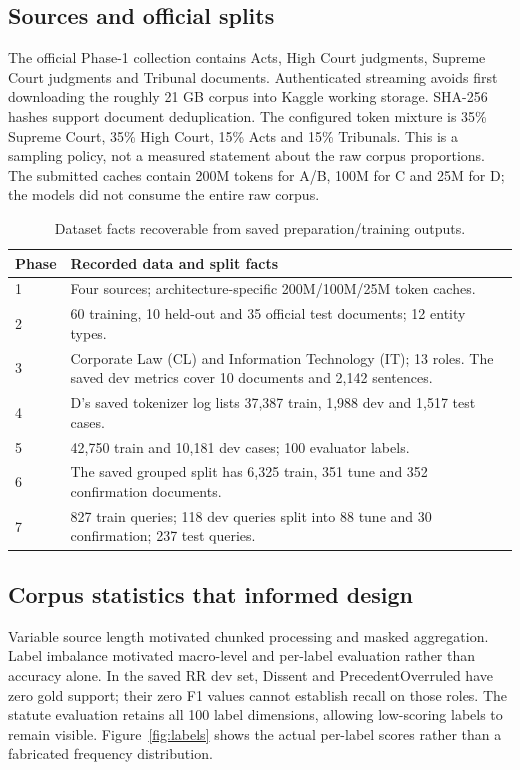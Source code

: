 \documentclass[11pt, oneside]{article}
\begin{document}
\subsection{Sources and official splits}
The official Phase-1 collection contains Acts, High Court judgments, Supreme Court
judgments and Tribunal documents. Authenticated streaming avoids first downloading
the roughly 21 GB corpus into Kaggle working storage. SHA-256 hashes support document
deduplication. The configured token mixture is 35\% Supreme Court, 35\% High Court,
15\% Acts and 15\% Tribunals. This is a sampling policy, not a measured statement
about the raw corpus proportions. The submitted caches contain 200M tokens for A/B,
100M for C and 25M for D; the models did not consume the entire raw corpus.
\begin{table}[H]\centering\small
\caption{Dataset facts recoverable from saved preparation/training outputs.}
\begin{tabular}{lp{11.4cm}}\toprule
Phase & Recorded data and split facts\\\midrule
1 & Four sources; architecture-specific 200M/100M/25M token caches.\\
2 & 60 training, 10 held-out and 35 official test documents; 12 entity types.\\
3 & Corporate Law (CL) and Information Technology (IT); 13 roles. The saved dev metrics cover 10 documents and 2,142 sentences.\\
4 & D's saved tokenizer log lists 37,387 train, 1,988 dev and 1,517 test cases.\\
5 & 42,750 train and 10,181 dev cases; 100 evaluator labels.\\
6 & The saved grouped split has 6,325 train, 351 tune and 352 confirmation documents.\\
7 & 827 train queries; 118 dev queries split into 88 tune and 30 confirmation; 237 test queries.\\\bottomrule
\end{tabular}\end{table}

\subsection{Corpus statistics that informed design}
Variable source length motivated chunked processing and masked aggregation. Label
imbalance motivated macro-level and per-label evaluation rather than accuracy alone.
In the saved RR dev set, Dissent and PrecedentOverruled have zero gold support; their
zero F1 values cannot establish recall on those roles. The statute evaluation retains
all 100 label dimensions, allowing low-scoring labels to remain visible. Figure~\ref{fig:labels}
shows the actual per-label scores rather than a fabricated frequency distribution.
\end{document}
